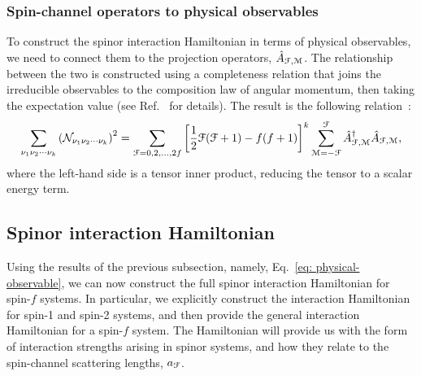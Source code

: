 \subsubsection{Spin-channel operators to physical observables}
To construct the spinor interaction Hamiltonian in terms of physical
observables, we need to connect them to the projection operators,
\(\hat{A}_{\EuScript{F}, \EuScript{M}}\).
The relationship between the two is constructed using a completeness relation
that joins the irreducible observables to the composition law of angular
momentum, then taking the expectation value (see Ref.~\cite{Kawaguchi2012} for
details).
The result is the following relation~\cite{Kawaguchi2012, Symes2019}:
\begin{align}\label{eq: physical-observable}
    \sum_{\nu_1\nu_2\cdots\nu_k}{(\mathcal{N}_{\nu_1\nu_2\cdots\nu_k})}^2 =
    \sum_{\EuScript{F} = 0, 2, \ldots, 2f}{\left[
        \frac{1}{2}\EuScript{F}(\EuScript{F} + 1) - f(f+1)
    \right]}^k \sum_{\EuScript{M} = -\EuScript{F}}^{\EuScript{F}}
    \hat{A}^\dagger_{\EuScript{F}, \EuScript{M}}
    \hat{A}_{\EuScript{F}, \EuScript{M}},
\end{align}
where the left-hand side is a tensor inner product, reducing the tensor to a
scalar energy term.

\subsection{\label{subsec: spinor-interaction-hamiltonian}
Spinor interaction Hamiltonian}
Using the results of the previous subsection, namely,
Eq.~\eqref{eq: physical-observable}, we can now construct the full spinor
interaction Hamiltonian for spin-\(f\) systems.
In particular, we explicitly construct the interaction Hamiltonian for spin-1
and spin-2 systems, and then provide the general interaction Hamiltonian for
a spin-\(f\) system.
The Hamiltonian will provide us with the form of interaction strengths arising
in spinor systems, and how they relate to the spin-channel scattering lengths,
\(a_\EuScript{F}\).

